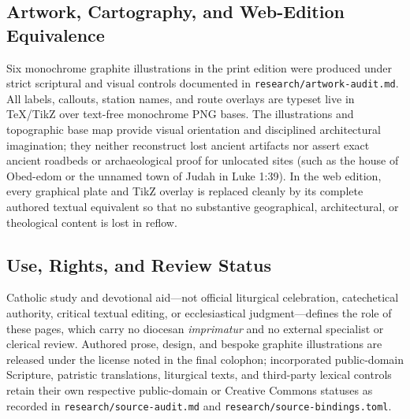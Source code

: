 \subsection{Artwork, Cartography, and Web-Edition Equivalence}

Six monochrome graphite illustrations in the print edition were produced under strict scriptural and visual controls documented in \texttt{research/artwork-audit.md}. All labels, callouts, station names, and route overlays are typeset live in TeX/TikZ over text-free monochrome PNG bases. The illustrations and topographic base map provide visual orientation and disciplined architectural imagination; they neither reconstruct lost ancient artifacts nor assert exact ancient roadbeds or archaeological proof for unlocated sites (such as the house of Obed-edom or the unnamed town of Judah in Luke 1:39). In the web edition, every graphical plate and TikZ overlay is replaced cleanly by its complete authored textual equivalent so that no substantive geographical, architectural, or theological content is lost in reflow.

\subsection{Use, Rights, and Review Status}

Catholic study and devotional aid---not official liturgical celebration, catechetical authority, critical textual editing, or ecclesiastical judgment---defines the role of these pages, which carry no diocesan \textit{imprimatur} and no external specialist or clerical review. Authored prose, design, and bespoke graphite illustrations are released under the license noted in the final colophon; incorporated public-domain Scripture, patristic translations, liturgical texts, and third-party lexical controls retain their own respective public-domain or Creative Commons statuses as recorded in \texttt{research/source-audit.md} and \texttt{research/source-bindings.toml}.

